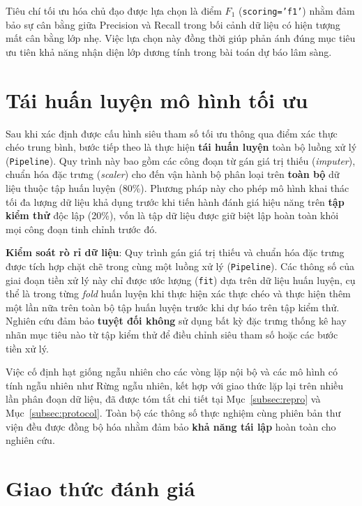 \documentclass[14pt,a4paper]{extreport}
\begin{document}
Tiêu chí tối ưu hóa chủ đạo được lựa chọn là điểm \textbf{$F_1$} (\texttt{scoring='f1'}) nhằm đảm bảo sự cân bằng giữa Precision và Recall trong bối cảnh dữ liệu có hiện tượng mất cân bằng lớp nhẹ. Việc lựa chọn này đồng thời giúp phản ánh đúng mục tiêu ưu tiên khả năng nhận diện lớp dương tính trong bài toán dự báo lâm sàng.

\section{Tái huấn luyện mô hình tối ưu}

Sau khi xác định được cấu hình siêu tham số tối ưu thông qua điểm xác thực chéo trung bình, bước tiếp theo là thực hiện \textbf{tái huấn luyện} toàn bộ luồng xử lý (\texttt{Pipeline}). Quy trình này bao gồm các công đoạn từ gán giá trị thiếu (\textit{imputer}), chuẩn hóa đặc trưng (\textit{scaler}) cho đến vận hành bộ phân loại trên \textbf{toàn bộ} dữ liệu thuộc tập huấn luyện (80\%). Phương pháp này cho phép mô hình khai thác tối đa lượng dữ liệu khả dụng trước khi tiến hành đánh giá hiệu năng trên \textbf{tập kiểm thử} độc lập (20\%), vốn là tập dữ liệu được giữ biệt lập hoàn toàn khỏi mọi công đoạn tinh chỉnh trước đó.

\textbf{Kiểm soát rò rỉ dữ liệu}: Quy trình gán giá trị thiếu và chuẩn hóa đặc trưng được tích hợp chặt chẽ trong cùng một luồng xử lý (\texttt{Pipeline}). Các thông số của giai đoạn tiền xử lý này chỉ được ước lượng (\texttt{fit}) dựa trên dữ liệu huấn luyện, cụ thể là trong từng \textit{fold} huấn luyện khi thực hiện xác thực chéo và thực hiện thêm một lần nữa trên toàn bộ tập huấn luyện trước khi dự báo trên tập kiểm thử. Nghiên cứu đảm bảo \textbf{tuyệt đối không} sử dụng bất kỳ đặc trưng thống kê hay nhãn mục tiêu nào từ tập kiểm thử để điều chỉnh siêu tham số hoặc các bước tiền xử lý.

Việc cố định hạt giống ngẫu nhiên cho các vòng lặp nội bộ và các mô hình có tính ngẫu nhiên như Rừng ngẫu nhiên, kết hợp với giao thức lặp lại trên nhiều lần phân đoạn dữ liệu, đã được tóm tắt chi tiết tại Mục~\ref{subsec:repro} và Mục~\ref{subsec:protocol}. Toàn bộ các thông số thực nghiệm cùng phiên bản thư viện đều được đồng bộ hóa nhằm đảm bảo \textbf{khả năng tái lập} hoàn toàn cho nghiên cứu.

\section{Giao thức đánh giá}
\label{subsec:metrics}
\end{document}
